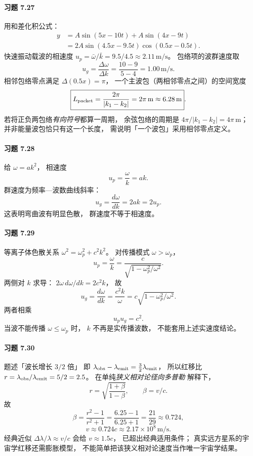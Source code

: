\paragraph{习题 7.27}
用和差化积公式：
\[
 \begin{aligned}
 y&=A\sin(5x-10t)+A\sin(4x-9t)\\
 &=\boxed{2A
 \sin(4.5x-9.5t)
 \cos(0.5x-0.5t)}.
 \end{aligned}
\]
快速振动载波的相速度
\(u_p=\bar\omega/\bar k=9.5/4.5
 \approx2.11\,\mathrm{m/s}\)。
包络项的波群速度取
\[
 \boxed{u_g=\frac{\Delta\omega}{\Delta k}
 =\frac{10-9}{5-4}
 =1.00\,\mathrm{m/s}}.
\]
相邻包络零点满足
\(\Delta(0.5x)=\pi\)，
一个主波包（两相邻零点之间）的空间宽度
\[
 \boxed{L_{\rm packet}=
 \frac{2\pi}{|k_1-k_2|}
 =2\pi\,\mathrm m\approx6.28\,\mathrm m}.
\]
若将正负两包络\emph{有向符号}都算一周期，
余弦包络的周期是
\(4\pi/|k_1-k_2|=4\pi\,\mathrm m\)；
并非能量波包恰只有这一个长度，
需说明「一个波包」采用相邻零点定义。

\paragraph{习题 7.28}
给
\(\omega=ak^2\)，
相速度
\[
 \boxed{u_p=\frac\omega k=ak}.
\]
群速度为频率—波数曲线斜率：
\[
 \boxed{u_g=\frac{d\omega}{dk}
 =2ak=2u_p}.
\]
这表明弯曲波有明显色散，
群速度不等于相速度。

\paragraph{习题 7.29}
等离子体色散关系
\(\omega^2=\omega_p^2+c^2k^2\)。
对传播模式 \(\omega>\omega_p\)，
\[
 \boxed{u_p=\frac{\omega}{k}
 =\frac{c}{\sqrt{1-\omega_p^2/\omega^2}}}.
\]
两侧对 \(k\) 求导：
\(2\omega\,d\omega/dk=2c^2k\)，
故
\[
 \boxed{u_g=\frac{d\omega}{dk}
 =\frac{c^2k}{\omega}
 =c\sqrt{1-\omega_p^2/\omega^2}}.
\]
两者相乘
\[
 \boxed{u_pu_g=c^2}.
\]
当波不能传播
\(\omega\le\omega_p\) 时，
\(k\) 不再是实传播波数，
不能套用上述实速度结论。

\paragraph{习题 7.30}
题述「波长增长 \(3/2\) 倍」
即
\(\lambda_{\rm obs}-\lambda_{\rm emit}
 =\tfrac32\lambda_{\rm emit}\)，
所以红移比
\(r=\lambda_{\rm obs}/\lambda_{\rm emit}
 =5/2=2.5\)。
在单纯\emph{狭义相对论径向多普勒}
解释下，
\[
 r=\sqrt{\frac{1+\beta}{1-\beta}},
 \qquad \beta=v/c.
\]
故
\[
 \boxed{\beta=\frac{r^2-1}{r^2+1}
 =\frac{6.25-1}{6.25+1}
 =\frac{21}{29}\approx0.724},
\]
\[
 \boxed{v\approx0.724c
 \approx2.17\times10^8\,\mathrm{m/s}}.
\]
经典近似
\(\Delta\lambda/\lambda\approx v/c\)
会给 \(v\approx1.5c\)，
已超出经典适用条件；
真实远方星系的宇宙学红移还需膨胀模型，
不能简单把该狭义相对论速度当作唯一宇宙学结果。

